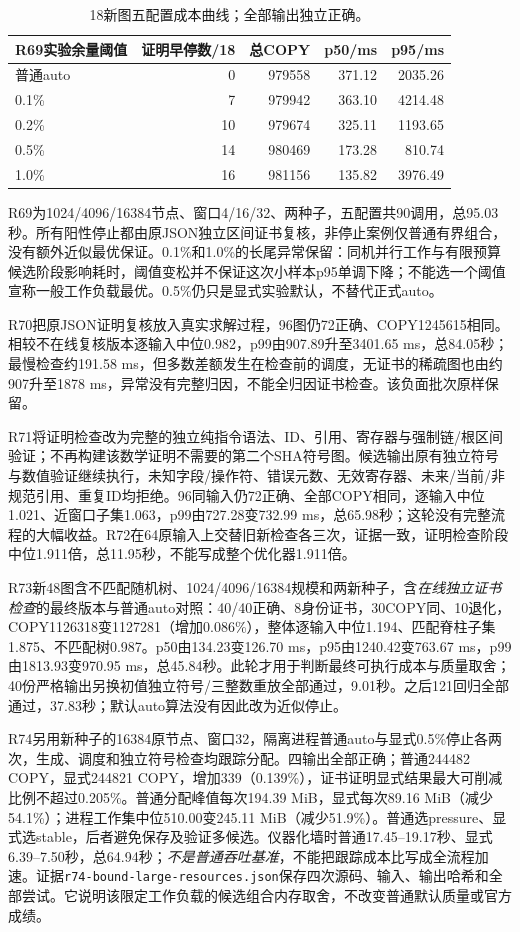 \documentclass[UTF8,11pt,fontset=fandol]{ctexart}
\begin{document}
\begin{table}[htbp]\centering\small
\begin{tabular}{lrrrr}\toprule
R69实验余量阈值 &证明早停数/18&总COPY&p50/ms&p95/ms\\\midrule
普通auto&0&979558&371.12&2035.26\\
0.1\%&7&979942&363.10&4214.48\\
0.2\%&10&979674&325.11&1193.65\\
0.5\%&14&980469&173.28&810.74\\
1.0\%&16&981156&135.82&3976.49\\\bottomrule
\end{tabular}\caption{18新图五配置成本曲线；全部输出独立正确。}\end{table}
R69为1024/4096/16384节点、窗口4/16/32、两种子，五配置共90调用，总95.03秒。所有阳性停止都由原JSON独立区间证书复核，非停止案例仅普通有界组合，没有额外近似最优保证。0.1\%和1.0\%的长尾异常保留：同机并行工作与有限预算候选阶段影响耗时，阈值变松并不保证这次小样本p95单调下降；不能选一个阈值宣称一般工作负载最优。0.5\%仍只是显式实验默认，不替代正式auto。

R70把原JSON证明复核放入真实求解过程，96图仍72正确、COPY1245615相同。相较不在线复核版本逐输入中位0.982，p99由907.89升至3401.65 ms，总84.05秒；最慢检查约191.58 ms，但多数差额发生在检查前的调度，无证书的稀疏图也由约907升至1878 ms，异常没有完整归因，不能全归因证书检查。该负面批次原样保留。

R71将证明检查改为完整的独立纯指令语法、ID、引用、寄存器与强制链/根区间验证；不再构建该数学证明不需要的第二个SHA符号图。候选输出原有独立符号与数值验证继续执行，未知字段/操作符、错误元数、无效寄存器、未来/当前/非规范引用、重复ID均拒绝。96同输入仍72正确、全部COPY相同，逐输入中位1.021、近窗口子集1.063，p99由727.28变732.99 ms，总65.98秒；这轮没有完整流程的大幅收益。R72在64原输入上交替旧新检查各三次，证据一致，证明检查阶段中位1.911倍，总11.95秒，不能写成整个优化器1.911倍。

R73新48图含不匹配随机树、1024/4096/16384规模和两新种子，含\emph{在线独立证书检查}的最终版本与普通auto对照：40/40正确、8身份证书，30COPY同、10退化，COPY1126318变1127281（增加0.086\%），整体逐输入中位1.194、匹配脊柱子集1.875、不匹配树0.987。p50由134.23变126.70 ms，p95由1240.42变763.67 ms，p99由1813.93变970.95 ms，总45.84秒。此轮才用于判断最终可执行成本与质量取舍；40份严格输出另换初值独立符号/三整数重放全部通过，9.01秒。之后121回归全部通过，37.83秒；默认auto算法没有因此改为近似停止。

R74另用新种子的16384原节点、窗口32，隔离进程普通auto与显式0.5\%停止各两次，生成、调度和独立符号检查均跟踪分配。四输出全部正确；普通244482 COPY，显式244821 COPY，增加339（0.139\%），证书证明显式结果最大可削减比例不超过0.205\%。普通分配峰值每次194.39 MiB，显式每次89.16 MiB（减少54.1\%）；进程工作集中位510.00变245.11 MiB（减少51.9\%）。普通选pressure、显式选stable，后者避免保存及验证多候选。仪器化墙时普通17.45--19.17秒、显式6.39--7.50秒，总64.94秒；\emph{不是普通吞吐基准}，不能把跟踪成本比写成全流程加速。证据\texttt{r74-bound-large-resources.json}保存四次源码、输入、输出哈希和全部尝试。它说明该限定工作负载的候选组合内存取舍，不改变普通默认质量或官方成绩。
\end{document}
